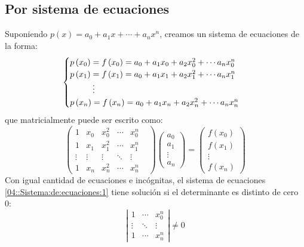 \documentclass[english, spanish, fleqn, 10pt]{article}
\numberwithin{equation}{section}
\newcommand{\nparentesis}[1]{\left( #1 \right)}
\newcommand{\nabsoluto}[1]{\left| #1 \right|}
\theoremstyle{definition}
\begin{document}
\subsection{Por sistema de ecuaciones}
Suponiendo $p\nparentesis{x}=a_0 + a_1 x + \cdots + a_n x^n$, creamos un sistema de ecuaciones de la forma:
\begin{equation*}
\begin{cases}
p\nparentesis{x_0}=f\nparentesis{x_0}=a_0+a_1x_0+a_2x_0^2+\cdots a_nx_0^n\\
p\nparentesis{x_1}=f\nparentesis{x_1}=a_0+a_1x_1+a_2x_1^2+\cdots a_nx_1^n\\
\hspace{9.5mm}\vdots\\
p\nparentesis{x_n}=f\nparentesis{x_n}=a_0+a_1x_n+a_2x_n^2+\cdots a_nx_n^n
\end{cases}
\end{equation*}
que matricialmente puede ser escrito como:
\begin{equation}\label{04::Sistema:de:ecuaciones:1}
	\begin{pmatrix}
	1 & x_0 & x_0^2 & \cdots & x_0^n\\
	1 & x_1 & x_1^2 & \cdots & x_1^n\\
	\vdots &\vdots &\vdots &\ddots&\vdots &\\
	1 & x_n & x_n^2 & \cdots & x_n^n
	\end{pmatrix}
	\begin{pmatrix}
	a_0\\
	a_1\\
	\vdots\\
	a_n
	\end{pmatrix}=
	\begin{pmatrix}
	f\nparentesis{x_0}\\
	f\nparentesis{x_1}\\
	\vdots\\
	f\nparentesis{x_n}
	\end{pmatrix}
\end{equation}
Con igual cantidad de ecuaciones e incógnitas, el sistema de ecuaciones \eqref{04::Sistema:de:ecuaciones:1} tiene solución si el determinante es distinto de cero 0:
\begin{equation}\label{04::Determinante:de:Vandermonde=0}
\nabsoluto{
	\begin{matrix}
	1 & \cdots & x_0^n\\
	\vdots & \ddots & \vdots \\
	1 & \cdots & x_n^n
	\end{matrix}}\ne 0
\end{equation}
\end{document}
